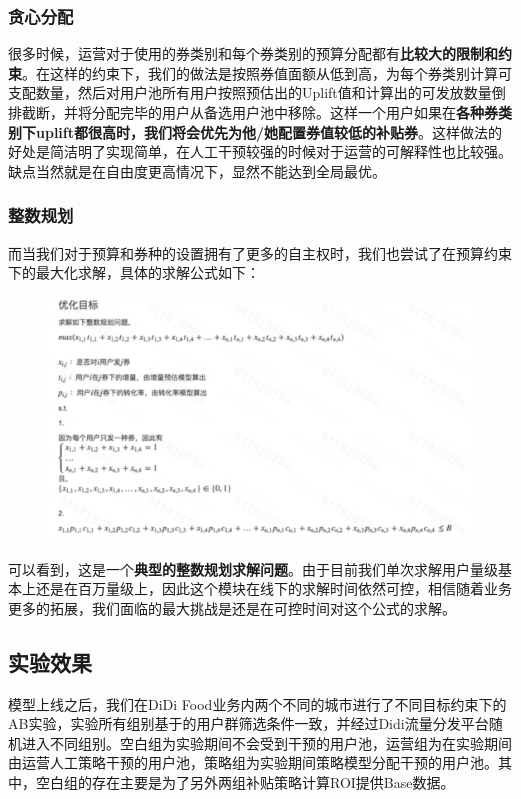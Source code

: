 \documentclass[12pt]{article}
\begin{document}
\subsubsection{贪心分配}
很多时候，运营对于使用的券类别和每个券类别的预算分配都有\textbf{比较大的限制和约束}。在这样的约束下，我们的做法是按照券值面额从低到高，为每个券类别计算可支配数量，然后对用户池所有用户按照预估出的Uplift值和计算出的可发放数量倒排截断，并将分配完毕的用户从备选用户池中移除。这样一个用户如果在\textbf{各种券类别下uplift都很高时，我们将会优先为他/她配置券值较低的补贴券}。这样做法的好处是简洁明了实现简单，在人工干预较强的时候对于运营的可解释性也比较强。缺点当然就是在自由度更高情况下，显然不能达到全局最优。

\subsubsection{整数规划}
而当我们对于预算和券种的设置拥有了更多的自主权时，我们也尝试了在预算约束下的最大化求解，具体的求解公式如下：
\begin{figure}[H]
    \centering
    \includegraphics[width=1\textwidth]{fig/Casual_Inference_In_Didi_17.png}
\end{figure}
可以看到，这是一个\textbf{典型的整数规划求解问题}。由于目前我们单次求解用户量级基本上还是在百万量级上，因此这个模块在线下的求解时间依然可控，相信随着业务更多的拓展，我们面临的最大挑战是还是在可控时间对这个公式的求解。

\subsection{实验效果}
模型上线之后，我们在DiDi Food业务内两个不同的城市进行了不同目标约束下的AB实验，实验所有组别基于的用户群筛选条件一致，并经过Didi流量分发平台随机进入不同组别。空白组为实验期间不会受到干预的用户池，运营组为在实验期间由运营人工策略干预的用户池，策略组为实验期间策略模型分配干预的用户池。其中，空白组的存在主要是为了另外两组补贴策略计算ROI提供Base数据。
\end{document}
